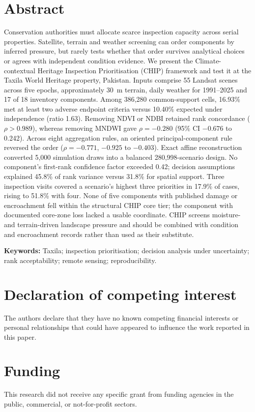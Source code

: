\documentclass[11pt,a4paper]{article}
\begin{document}
\section*{Abstract}
Conservation authorities must allocate scarce inspection capacity across serial properties. Satellite, terrain and weather screening can order components by inferred pressure, but rarely tests whether that order survives analytical choices or agrees with independent condition evidence. We present the Climate-contextual Heritage Inspection Prioritisation (CHIP) framework and test it at the Taxila World Heritage property, Pakistan. Inputs comprise 55 Landsat scenes across five epochs, approximately 30~m terrain, daily weather for 1991--2025 and 17 of 18 inventory components. Among 386,280 common-support cells, 16.93\% met at least two adverse endpoint criteria versus 10.40\% expected under independence (ratio 1.63). Removing NDVI or NDBI retained rank concordance ($\rho>0.989$), whereas removing MNDWI gave $\rho=-0.280$ (95\% CI $-0.676$ to 0.242). Across eight aggregation rules, an oriented principal-component rule reversed the order ($\rho=-0.771$, $-0.925$ to $-0.403$). Exact affine reconstruction converted 5,000 simulation draws into a balanced 280,998-scenario design. No component's first-rank confidence factor exceeded 0.42; decision assumptions explained 45.8\% of rank variance versus 31.8\% for spatial support. Three inspection visits covered a scenario's highest three priorities in 17.9\% of cases, rising to 51.8\% with four. None of five components with published damage or encroachment fell within the structural CHIP core tier; the component with documented core-zone loss lacked a usable coordinate. CHIP screens moisture- and terrain-driven landscape pressure and should be combined with condition and encroachment records rather than used as their substitute.

\noindent\textbf{Keywords:} Taxila; inspection prioritisation; decision analysis under uncertainty; rank acceptability; remote sensing; reproducibility.

\section*{Declaration of competing interest}
The authors declare that they have no known competing financial interests or
personal relationships that could have appeared to influence the work reported in
this paper.

\section*{Funding}
This research did not receive any specific grant from funding agencies in the
public, commercial, or not-for-profit sectors.
\end{document}
